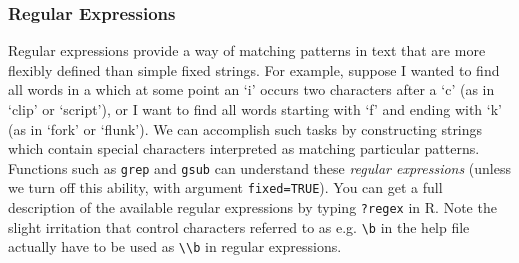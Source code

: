 \documentclass[10pt] {article}
\theoremstyle{definition}
\begin{document}
\subsubsection{Regular Expressions}

Regular expressions provide a way of matching patterns in text that are more flexibly defined than simple fixed strings. For example, suppose I wanted to find all words in a which at some point an `i' occurs two characters after a `c' (as in `clip' or `script'), or I want to find all words starting with `f' and ending with `k' (as in `fork' or `flunk'). We can accomplish such tasks by constructing strings which contain special characters interpreted as matching particular patterns. Functions such as {\tt grep} and {\tt gsub} can understand these {\em regular expressions} (unless we turn off this ability, with argument \lstinline+fixed=TRUE+). You can get a full description of the available regular expressions by typing \lstinline+?regex+ in R.  Note the slight irritation that control characters referred to as e.g. \verb+\b+ in the help file actually have to be used as \verb+\\b+ in regular expressions.
\end{document}
